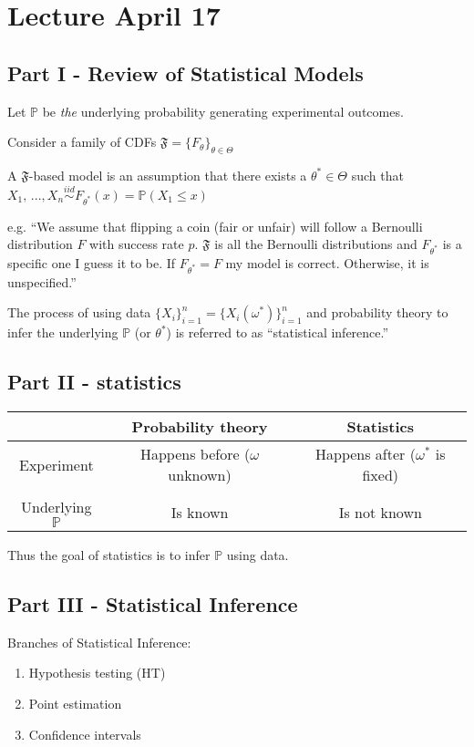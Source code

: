 \documentclass[12pt]{article}
\renewcommand{\P}{\mathbb{P}}
\begin{document}
\section*{Lecture April 17}
\subsection*{Part I - Review of Statistical Models}
Let $\P$ be \emph{the} underlying probability generating experimental outcomes. 

Consider a family of CDFs $\mathfrak{F} = \{F_\theta\}_{\theta \in \Theta}$ 

A $\mathfrak{F}$-based model is an assumption that there exists a $\theta^* \in \Theta$ such that $X_1,\, ..., X_n \overset{iid}{\sim} F_{\theta^*}(x) = \P(X_1 \leq x)$

e.g. ``We assume that flipping a coin (fair or unfair) will follow a Bernoulli distribution $F$ with success rate $p$. $\mathfrak{F}$ is all the Bernoulli distributions and $F_{\theta^*}$ is a specific one I guess it to be. If $F_{\theta^*} = F$ my model is correct. Otherwise, it is unspecified.''

The process of using data $\{X_i\}_{i=1}^n = \{X_i(\omega^*)\}_{i=1}^n$ and probability theory to infer the underlying $\P$ (or $\theta^*$) is referred to as ``statistical inference.''

\subsection*{Part II - statistics}
\begin{center}
    \begin{tabular}{|c|cc|}
        \hline
        & Probability theory & Statistics\\
        \hline
        Experiment & Happens before ($\omega$ unknown) & Happens after ($\omega^*$ is fixed)\\
        & &\\
        Underlying $\P$ & Is known & Is not known\\
        \hline
    \end{tabular}
\end{center}

Thus the goal of statistics is to infer $\P$ using data. 

\subsection*{Part III - Statistical Inference}
Branches of Statistical Inference:
\begin{enumerate}
    \item Hypothesis testing (HT)
    \item Point estimation
    \item Confidence intervals
\end{enumerate}
\end{document}
